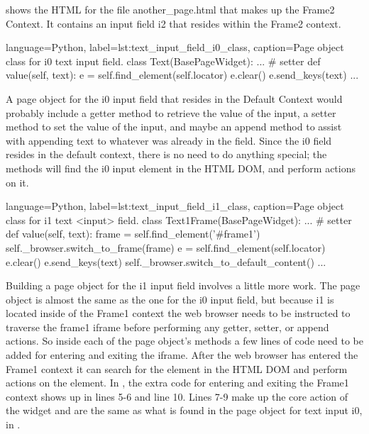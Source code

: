  shows the HTML for the
file another\_page.html that makes up the Frame2 Context. It contains an input
field i2 that resides within the Frame2 context.


\begin{xcode}{%
  language=Python,%
  label=lst:text_input_field_i0_class,%
  caption={Page object class for i0 text input field.}%
}
class Text(BasePageWidget):
    ...
    # setter
    def value(self, text):
        e = self.find_element(self.locator)
        e.clear()
        e.send_keys(text)
    ...
\end{xcode}

A page object for the i0 input field that resides in the Default Context
would probably include a getter method to retrieve the value of the input, a
setter method to set the value of the input, and maybe an append method to
assist with appending text to whatever was already in the field.  Since the i0
field resides in the default context, there is no need to do anything special;
the methods will find the i0 input element in the HTML DOM, and perform actions
on it.

\begin{xcode}{%
  language=Python,%
  label=lst:text_input_field_i1_class,%
  caption={Page object class for i1 text <input> field.}%
}
class Text1Frame(BasePageWidget):
    ...
    # setter
    def value(self, text):
        frame = self.find_element('#frame1')
        self._browser.switch_to_frame(frame)
        e = self.find_element(self.locator)
        e.clear()
        e.send_keys(text)
        self._browser.switch_to_default_content()
    ...
\end{xcode}

Building a page object for the i1 input field involves a little more work.
The page object is almost the same as the one for the i0 input field, but
because i1 is located inside of the Frame1 context the web browser needs to be
instructed to traverse the frame1 iframe before performing any getter, setter,
or append actions.  So inside each of the page object's methods a few lines of
code need to be added for entering and exiting the iframe. After the web
browser has entered the Frame1 context it can search for the element in the
HTML DOM and perform actions on the element.  In
, the extra code for entering and exiting
the Frame1 context shows up in lines 5-6 and line 10.  Lines 7-9 make up the
core action of the widget and are the same as what is found in the page object
for text input i0, in .


